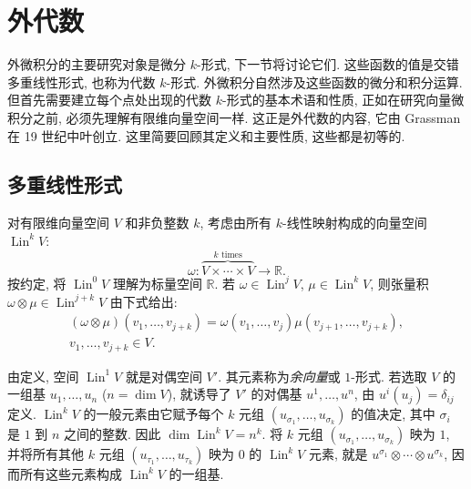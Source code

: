 \section{{外代数}}\label{sec:exterior-algebra}

{外微积分的主要研究对象是微分 $k$-形式, 下一节将讨论它们. 这些函数的值是交错多重线性形式, 也称为代数 $k$-形式. 外微积分自然涉及这些函数的微分和积分运算. 但首先需要建立每个点处出现的代数 $k$-形式的基本术语和性质, 正如在研究向量微积分之前, 必须先理解有限维向量空间一样. 这正是外代数的内容, 它由 Grassman 在 19 世纪中叶创立. 这里简要回顾其定义和主要性质, 这些都是初等的.}

\subsection{{多重线性形式}}\label{subsec:multilinear-forms}

{对有限维向量空间 $V$ 和非负整数 $k$, 考虑由所有 $k$-线性映射构成的向量空间 $\operatorname{Lin}^kV$:}
\[
\omega:\overbrace{V\times\cdots\times V}^{k\text{ times}}\to\mathbb R.
\]
{按约定, 将 $\operatorname{Lin}^0V$ 理解为标量空间 $\mathbb R$. 若 $\omega\in\operatorname{Lin}^jV$, $\mu\in\operatorname{Lin}^kV$, 则张量积 $\omega\otimes\mu\in\operatorname{Lin}^{j+k}V$ 由下式给出:}
\[
\begin{gathered}
(\omega\otimes\mu)(v_1,\ldots,v_{j+k})=\omega(v_1,\ldots,v_j)\mu(v_{j+1},\ldots,v_{j+k}),\\
v_1,\ldots,v_{j+k}\in V.
\end{gathered}
\]

{由定义, 空间 $\operatorname{Lin}^1V$ 就是对偶空间 $V'$. 其元素称为\emph{余向量}或 $1$-形式. 若选取 $V$ 的一组基 $u_1,\ldots,u_n$ ($n=\dim V$), 就诱导了 $V'$ 的对偶基 $u^1,\ldots,u^n$, 由 $u^i(u_j)=\delta_{ij}$ 定义. $\operatorname{Lin}^kV$ 的一般元素由它赋予每个 $k$ 元组 $(u_{\sigma_1},\ldots,u_{\sigma_k})$ 的值决定, 其中 $\sigma_i$ 是 $1$ 到 $n$ 之间的整数. 因此 $\dim\operatorname{Lin}^kV=n^k$. 将 $k$ 元组 $(u_{\sigma_1},\ldots,u_{\sigma_k})$ 映为 $1$, 并将所有其他 $k$ 元组 $(u_{\tau_1},\ldots,u_{\tau_k})$ 映为 $0$ 的 $\operatorname{Lin}^kV$ 元素, 就是 $u^{\sigma_1}\otimes\cdots\otimes u^{\sigma_k}$, 因而所有这些元素构成 $\operatorname{Lin}^kV$ 的一组基.}

